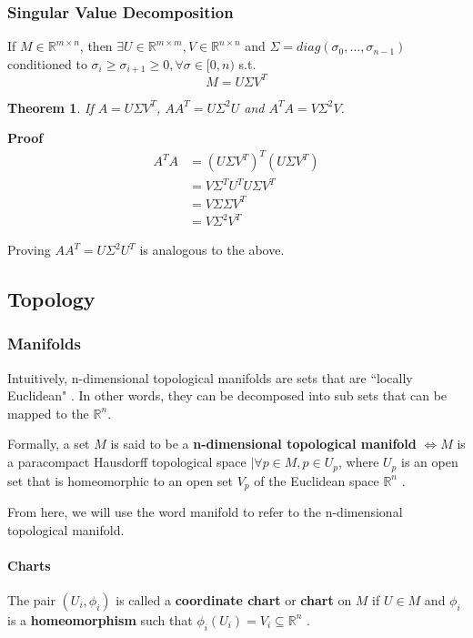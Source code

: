 \documentclass[12pt]{article}
\newtheorem{theorem}{Theorem}[section]
\begin{document}
\subsubsection{Singular Value Decomposition}
\label{sec:svd}
If $M \in \mathbb{R}^{m \times n}$, then $\exists U \in \mathbb{R}^{m \times m}, V \in \mathbb{R}^{n \times n}$ and $\Sigma =  diag(\sigma_0, \dots, \sigma_{n-1})$ conditioned to $\sigma_i \ge \sigma_{i+1} \ge 0, \forall \sigma \in [0, n)$ s.t. \cite{gan2008}
$$M = U\Sigma V^T$$

\begin{theorem}
	\label{th:svd-aat}
	If $A = U \Sigma V^T$, $AA^T = U \Sigma^2 U$ and $A^TA = V \Sigma^2 V$.
\end{theorem}
\textbf{Proof}
\begin{align*}
	A^TA &= (U\Sigma V^T)^T(U\Sigma V^T) \\
	&= V \Sigma^T U^T U \Sigma V^T \\
	&= V \Sigma \Sigma V^T \\
	&= V \Sigma^2 V^T
\end{align*}

Proving $AA^T = U \Sigma^2 U^T$ is analogous to the above.

\subsection{Topology}
\subsubsection{Manifolds}

Intuitively, n-dimensional topological manifolds are sets that are ``locally Euclidean" \cite{lee2009}. In other words, they can be decomposed into sub sets that can be mapped to the $\mathbb{R}^n$.

Formally, a set $M$ is said to be a \textbf{n-dimensional topological manifold} $\iff M$ is a paracompact Hausdorff topological space $\mid \forall p \in M, p \in U_p$, where $U_p$ is an open set that is homeomorphic to an open set $V_p$ of the Euclidean space $\mathbb{R}^n$ \cite{lee2009}.

From here, we will use the word manifold to refer to the n-dimensional topological manifold.

\paragraph{Charts}
The pair $(U_i, \phi_i)$ is called a \textbf{coordinate chart} or \textbf{chart} on $M$ if $U \in M$ and $\phi_i$ is a \textbf{homeomorphism} such that $\phi_i(U_i) = V_i \subseteq \mathbb{R}^n$ \cite{lee2012}.
\end{document}
